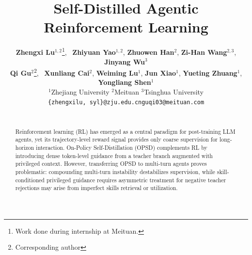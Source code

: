 \documentclass{article} %
\title{Self-Distilled Agentic Reinforcement Learning}
\author{
\textbf{Zhengxi Lu}$^{1,2}$\thanks{Work done during internship at Meituan.},~ \textbf{Zhiyuan Yao}$^{1,2}$, 
\textbf{Zhuowen Han}$^{2}$, \textbf{Zi-Han Wang}$^{2,3}$, \textbf{Jinyang Wu}$^{3}$\\
\textbf{Qi Gu}$^{2}$\thanks{Corresponding author},~
\textbf{Xunliang Cai}$^{2}$,
\textbf{Weiming Lu}$^{1}$, 
\textbf{Jun Xiao}$^{1}$,
\textbf{Yueting Zhuang}$^{1}$,
 \textbf{Yongliang Shen}$^{1}$\footnotemark[2]\\[3pt]
  $^1$Zhejiang University \qquad$^2$Meituan \qquad$^3$Tsinghua University\\
  \texttt{\small \{zhengxilu, syl\}@zju.edu.cn\qquad guqi03@meituan.com} \\
  \begin{tabular}{@{}ll@{}}
  \end{tabular}}
\newcommand{\methodname}{\textsc{SDAR}\xspace}
\begin{document}
\ifcolmsubmission
\linenumbers
\fi

\maketitle
\vspace{-15pt}

\begin{abstract}
Reinforcement learning (RL) has emerged as a central paradigm for post-training LLM agents, yet its trajectory-level reward signal provides only coarse supervision for long-horizon interaction. 
On-Policy Self-Distillation (OPSD) complements RL by introducing dense token-level guidance from a teacher branch augmented with privileged context. 
However, transferring OPSD to multi-turn agents proves problematic: compounding multi-turn instability destabilizes supervision, while skill-conditioned privileged guidance requires asymmetric treatment for negative teacher rejections may arise from imperfect skills retrieval or utilization.

\end{abstract}
\end{document}
